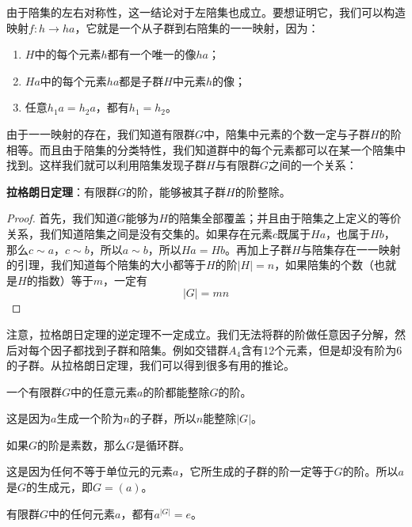 \documentclass[b5paper]{ctexart}
\begin{document}
由于陪集的左右对称性，这一结论对于左陪集也成立。要想证明它，我们可以构造映射$f: h \to ha$，它就是一个从子群到右陪集的一一映射，因为：

\begin{enumerate}
\item $H$中的每个元素$h$都有一个唯一的像$ha$；
\item $Ha$中的每个元素$ha$都是子群$H$中元素$h$的像；
\item 任意$h_1a = h_2a$，都有$h_1 = h_2$。
\end{enumerate}

由于一一映射的存在，我们知道有限群$G$中，陪集中元素的个数一定与子群$H$的阶相等。而且由于陪集的分类特性，我们知道群中的每个元素都可以在某一个陪集中找到。这样我们就可以利用陪集发现子群$H$与有限群$G$之间的一个关系：

\begin{theorem}
\textbf{拉格朗日定理}：有限群$G$的阶，能够被其子群$H$的阶整除。
\end{theorem}

\begin{proof}
首先，我们知道$G$能够为$H$的陪集全部覆盖；并且由于陪集之上定义的等价关系，我们知道陪集之间是没有交集的。如果存在元素$c$既属于$Ha$，也属于$Hb$，那么$c \sim a$，$c \sim b$，所以$a \sim b$，所以$Ha = Hb$。再加上子群$H$与陪集存在一一映射的引理，我们知道每个陪集的大小都等于$H$的阶$|H|=n$，如果陪集的个数（也就是$H$的指数）等于$m$，一定有
\[
|G| = mn
\]
\end{proof}

注意，拉格朗日定理的逆定理不一定成立。我们无法将群的阶做任意因子分解，然后对每个因子都找到子群和陪集。例如交错群$A_4$含有12个元素，但是却没有阶为6的子群。从拉格朗日定理，我们可以得到很多有用的推论。

\begin{corollary}
一个有限群$G$中的任意元素$a$的阶都能整除$G$的阶。
\end{corollary}

这是因为$a$生成一个阶为$n$的子群，所以$n$能整除$|G|$。

\begin{corollary}
如果$G$的阶是素数，那么$G$是循环群。
\label{co:prime-order-group}
\end{corollary}

这是因为任何不等于单位元的元素$a$，它所生成的子群的阶一定等于$G$的阶。所以$a$是$G$的生成元，即$G = (a)$。

\begin{corollary}
有限群$G$中的任何元素$a$，都有$a^{|G|} = e$。
\label{corollary:Lagrange-elem-order}
\end{corollary}
\end{document}
